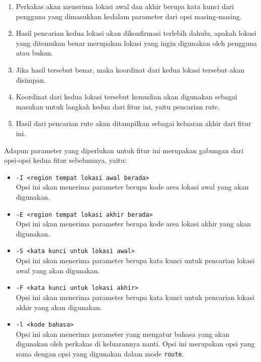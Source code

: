 \documentclass[a4paper,twoside]{article}
\begin{document}
\begin{enumerate}
\begin{itemize}
\begin{itemize}
		\begin{enumerate}
			\item Perkakas akan menerima lokasi awal dan akhir berupa kata kunci dari pengguna yang dimasukkan kedalam parameter dari opsi masing-masing.
			\item Hasil pencarian kedua lokasi akan dikonfirmasi terlebih dahulu, apakah lokasi yang \linebreak ditemukan benar merupakan lokasi yang ingin digunakan oleh pengguna atau bukan.
			\item Jika hasil tersebut benar, maka koordinat \latlon dari kedua lokasi tersebut akan disimpan.
			\item Koordinat \latlon dari kedua lokasi tersebut kemudian akan digunakan sebagai masukan untuk langkah kedua dari fitur ini, yaitu pencarian rute.
			\item Hasil dari pencarian rute akan ditampilkan sebagai keluaran akhir dari fitur ini.
		\end{enumerate}
		\noindent
		Adapun parameter yang diperlukan untuk fitur ini merupakan gabungan dari opsi-opsi kedua fitur sebelumnya, yaitu:
		
		\begin{itemize}
			\item \verb|-I <region tempat lokasi awal berada>|\\
			Opsi ini akan menerima parameter berupa kode area lokasi awal yang akan digunakan.
			\item \verb|-E <region tempat lokasi akhir berada>|\\
			Opsi ini akan menerima parameter berupa kode area lokasi akhir yang akan digunakan.
			\item \verb|-S <kata kunci untuk lokasi awal>|\\
			Opsi ini akan menerima parameter berupa kata kunci untuk pencarian lokasi awal yang akan digunakan.
			\item \verb|-F <kata kunci untuk lokasi akhir>|\\
			Opsi ini akan menerima parameter berupa kata kunci untuk pencarian lokasi akhir yang akan digunakan.
			\item \verb|-l <kode bahasa>|\\
			Opsi ini akan menerima parameter yang mengatur bahasa yang akan digunakan oleh perkakas di keluarannya nanti. Opsi ini merupakan opsi yang sama dengan opsi yang digunakan dalam mode \verb|route|.
		\end{itemize}
		
	\end{itemize}
	

\end{itemize}
\end{enumerate}
\end{document}
